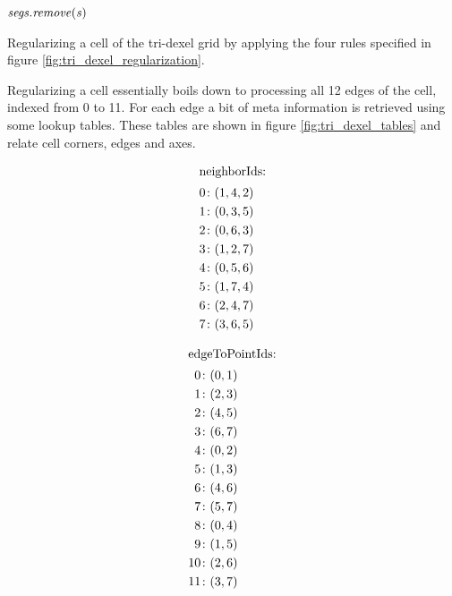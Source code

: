 \begin{algorithm}
\begin{algorithmic}[1]
						\State $\mathit{segs}.\mathit{remove}(\mathit{s})$
					\EndIf
				\EndFor
			\EndFor
		\EndFunction
	\end{algorithmic}
	\caption{
		Regularizing a cell of the tri-dexel grid by applying the four rules specified in figure \ref{fig:tri_dexel_regularization}.
	}
	\label{alg:tri_dexel_regularization}
\end{algorithm}
%
Regularizing a cell essentially boils down to processing all 12 edges of the cell, indexed from 0 to 11.
For each edge a bit of meta information is retrieved using some lookup tables.
These tables are shown in figure \ref{fig:tri_dexel_tables} and relate cell corners, edges and axes.
%
\begin{figure}
	\begin{subfigure}[t]{0.24\textwidth}
		\centering
		\begin{align*}
			\shortintertext{neighborIds:}
			0 &\colon (1, 4, 2) \\
			1 &\colon (0, 3, 5) \\
			2 &\colon (0, 6, 3) \\
			3 &\colon (1, 2, 7) \\
			4 &\colon (0, 5, 6) \\
			5 &\colon (1, 7, 4) \\
			6 &\colon (2, 4, 7) \\
			7 &\colon (3, 6, 5)
		\end{align*}
	\end{subfigure}
	\begin{subfigure}[t]{0.24\textwidth}
		\centering
		\begin{align*}
			\shortintertext{edgeToPointIds:}
			 0 &\colon (0, 1) \\
			 1 &\colon (2, 3) \\
			 2 &\colon (4, 5) \\
			 3 &\colon (6, 7) \\
			 4 &\colon (0, 2) \\
			 5 &\colon (1, 3) \\
			 6 &\colon (4, 6) \\
			 7 &\colon (5, 7) \\
			 8 &\colon (0, 4) \\
			 9 &\colon (1, 5) \\
			10 &\colon (2, 6) \\
			11 &\colon (3, 7)

\end{align*}
\end{subfigure}
\end{figure}
